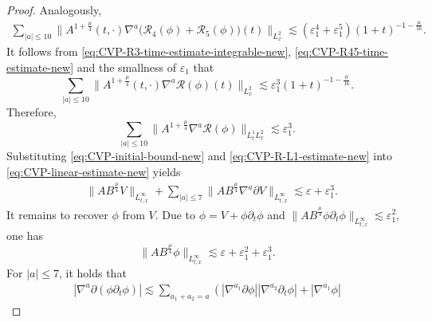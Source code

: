 \documentclass[11pt,twoside]{article}
\def\p{\partial}
\def\ve{\varepsilon}
\def\ls{\lesssim}
\theoremstyle{plain}
\theoremstyle{definition}
\theoremstyle{assumption}
\numberwithin{equation}{section}
\begin{document}
\begin{proof}
		Analogously,
		\begin{equation}
			\label{eq:CVP-R45-time-estimate-new}
			\begin{aligned}
				\sum_{|a|\le 10}
				\big\|
				A^{1+\frac{\mu}{4}}(t,\cdot)
				\nabla^a
				\big(
				\mathcal R_4(\phi)+\mathcal R_5(\phi)
				\big)(t)
				\big\|_{L^2_x}
				\ls
				(\ve_1^4+\ve_1^5)
				(1+t)^{-1-\frac{\mu}{16}}.
			\end{aligned}
		\end{equation}
		It follows from
		\eqref{eq:CVP-R3-time-estimate-integrable-new},
		\eqref{eq:CVP-R45-time-estimate-new} and the smallness of \(\ve_1\) that
		\begin{equation}
			\label{eq:CVP-R-time-estimate-new}
			\sum_{|a|\le 10}
			\big\|
			A^{1+\frac{\mu}{4}}(t,\cdot)
			\nabla^a\mathcal R(\phi)(t)
			\big\|_{L^2_x}
			\ls
			\ve_1^3
			(1+t)^{-1-\frac{\mu}{16}}.
		\end{equation}
		Therefore,
		\begin{equation}
			\label{eq:CVP-R-L1-estimate-new}
			\sum_{|a|\le 10}
			\big\|
			A^{1+\frac{\mu}{4}}
			\nabla^a\mathcal R(\phi)
			\big\|_{L^1_tL^2_x}
			\ls
			\ve_1^3.
		\end{equation}
		Substituting \eqref{eq:CVP-initial-bound-new} and
		\eqref{eq:CVP-R-L1-estimate-new} into
		\eqref{eq:CVP-linear-estimate-new} yields
		\begin{equation}
			\label{eq:CVP-V-final-bound-new}
			\begin{aligned}
				&
				\|AB^{\frac{\mu}{4}}V\|_{L^\infty_{t,x}}
				+
				\sum_{|a|\le 7}
				\big\|
				AB^{\frac{\mu}{4}}
				\nabla^a\p V
				\big\|_{L^\infty_{t,x}}
				\ls
				\ve+\ve_1^3.
			\end{aligned}
		\end{equation}
		It remains to recover \(\phi\) from \(V\). Due to $\phi=V+\phi\p_t\phi$
		and
		$\big\|AB^{\frac{\mu}{4}}\phi\p_t\phi
			\big\|_{L^\infty_{t,x}}\ls\ve_1^2,$
		one has
		\begin{equation}
			\label{eq:CVP-zero-order-phi-new}
			\big\|
			AB^{\frac{\mu}{4}}\phi
			\big\|_{L^\infty_{t,x}}
			\ls
			\ve+\ve_1^2+\ve_1^3.
		\end{equation}
		For \(|a|\le 7\), it holds that
		\begin{equation}\label{eq:CVP-recovery-Leibniz-new}
			\begin{aligned}
				\left|
				\nabla^a\p(\phi\p_t\phi)
				\right|
				\ls
				\sum_{a_1+a_2=a}
				\left(
				|\nabla^{a_1}\p\phi|
				|\nabla^{a_2}\p_t\phi|
				+
				|\nabla^{a_1}\phi|

\end{aligned}
\end{equation}
\end{proof}
\end{document}
